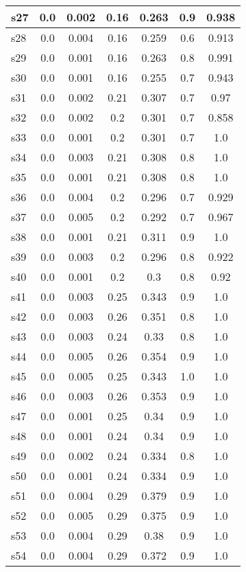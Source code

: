 \documentclass{article}
\begin{document}
\begin{tabular}{|l|c|c|c|c|c|c|}
\hline
s27 &0.0 & 0.002 & 0.16 & 0.263 & 0.9 & 0.938\\
\hline
s28 &0.0 & 0.004 & 0.16 & 0.259 & 0.6 & 0.913\\
\hline
s29 &0.0 & 0.001 & 0.16 & 0.263 & 0.8 & 0.991\\
\hline
s30 &0.0 & 0.001 & 0.16 & 0.255 & 0.7 & 0.943\\
\hline
s31 &0.0 & 0.002 & 0.21 & 0.307 & 0.7 & 0.97\\
\hline
s32 &0.0 & 0.002 & 0.2 & 0.301 & 0.7 & 0.858\\
\hline
s33 &0.0 & 0.001 & 0.2 & 0.301 & 0.7 & 1.0\\
\hline
s34 &0.0 & 0.003 & 0.21 & 0.308 & 0.8 & 1.0\\
\hline
s35 &0.0 & 0.001 & 0.21 & 0.308 & 0.8 & 1.0\\
\hline
s36 &0.0 & 0.004 & 0.2 & 0.296 & 0.7 & 0.929\\
\hline
s37 &0.0 & 0.005 & 0.2 & 0.292 & 0.7 & 0.967\\
\hline
s38 &0.0 & 0.001 & 0.21 & 0.311 & 0.9 & 1.0\\
\hline
s39 &0.0 & 0.003 & 0.2 & 0.296 & 0.8 & 0.922\\
\hline
s40 &0.0 & 0.001 & 0.2 & 0.3 & 0.8 & 0.92\\
\hline
s41 &0.0 & 0.003 & 0.25 & 0.343 & 0.9 & 1.0\\
\hline
s42 &0.0 & 0.003 & 0.26 & 0.351 & 0.8 & 1.0\\
\hline
s43 &0.0 & 0.003 & 0.24 & 0.33 & 0.8 & 1.0\\
\hline
s44 &0.0 & 0.005 & 0.26 & 0.354 & 0.9 & 1.0\\
\hline
s45 &0.0 & 0.005 & 0.25 & 0.343 & 1.0 & 1.0\\
\hline
s46 &0.0 & 0.003 & 0.26 & 0.353 & 0.9 & 1.0\\
\hline
s47 &0.0 & 0.001 & 0.25 & 0.34 & 0.9 & 1.0\\
\hline
s48 &0.0 & 0.001 & 0.24 & 0.34 & 0.9 & 1.0\\
\hline
s49 &0.0 & 0.002 & 0.24 & 0.334 & 0.8 & 1.0\\
\hline
s50 &0.0 & 0.001 & 0.24 & 0.334 & 0.9 & 1.0\\
\hline
s51 &0.0 & 0.004 & 0.29 & 0.379 & 0.9 & 1.0\\
\hline
s52 &0.0 & 0.005 & 0.29 & 0.375 & 0.9 & 1.0\\
\hline
s53 &0.0 & 0.004 & 0.29 & 0.38 & 0.9 & 1.0\\
\hline
s54 &0.0 & 0.004 & 0.29 & 0.372 & 0.9 & 1.0\\

\end{tabular}
\end{document}
